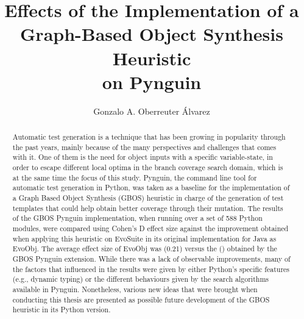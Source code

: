 \documentclass[%
  chapterprefix=false,%
  open=right,%
  twoside=true,%
  paper=a4,%
  logofile={Figures/logo.png},%
  thesistype=master,%
  UKenglish,%
]{se2thesis}
\author{Gonzalo A. Oberreuter Álvarez}
\title{Effects of the Implementation of a Graph-Based Object Synthesis Heuristic \\ on Pynguin}
\institute{Chair of Software Engineering}
\begin{document}
\frontmatter

\maketitle

\authorshipDeclaration{}

\begin{abstract}
  Automatic test generation is a technique that has been growing in popularity through the past years, mainly because of the many perspectives and challenges that comes with it.
  One of them is the need for object inputs with a specific variable-state, in order to escape different local optima in the branch coverage search domain, which is at the same time the focus of this study.
  Pynguin, the command line tool for automatic test generation in Python, was taken as a baseline for the implementation of a Graph Based Object Synthesis (GBOS) heuristic in charge of the generation of test templates that could help obtain better coverage through their mutation.
  The results of the GBOS Pynguin implementation, when running over a set of 588 Python modules, were compared using Cohen's D effect size against the improvement obtained when applying this heuristic on EvoSuite in its original implementation for Java as EvoObj.
  The average effect size of EvoObj was (0.21) versus the (\AverageCohen) obtained by the GBOS Pynguin extension.
  While there was a lack of observable improvements, many of the factors that influenced in the results were given by either Python's specific features (e.g., dynamic typing) or the different behaviours given by the search algorithms available in Pynguin.
  Nonetheless, various new ideas that were brought when conducting this thesis are presented as possible future development of the GBOS heuristic in its Python version.
\end{abstract}

\newpage
\end{document}
